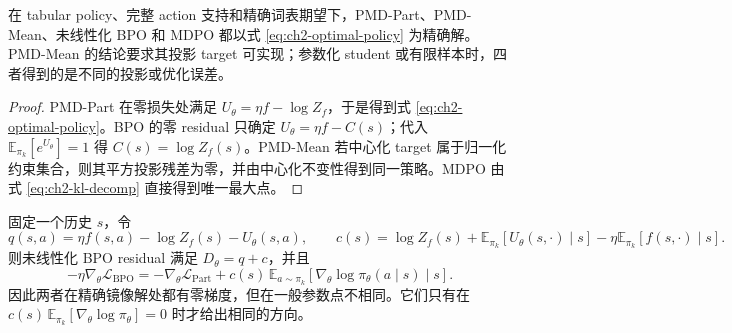 \begin{theorem}
\label{thm:ch2-inner-common-root}
在 tabular policy、完整 action 支持和精确词表期望下，PMD-Part、PMD-Mean、未线性化 BPO 和 MDPO 都以式 \eqref{eq:ch2-optimal-policy} 为精确解。PMD-Mean 的结论要求其投影 target 可实现；参数化 student 或有限样本时，四者得到的是不同的投影或优化误差。
\end{theorem}

\begin{proof}
PMD-Part 在零损失处满足 $U_\theta=\eta f-\log Z_f$，于是得到式 \eqref{eq:ch2-optimal-policy}。BPO 的零 residual 只确定 $U_\theta=\eta f-C(s)$；代入 $\mathbb E_{\pi_k}[e^{U_\theta}]=1$ 得 $C(s)=\log Z_f(s)$。PMD-Mean 若中心化 target 属于归一化约束集合，则其平方投影残差为零，并由中心化不变性得到同一策略。MDPO 由式 \eqref{eq:ch2-kl-decomp} 直接得到唯一最大点。
\end{proof}


\begin{proposition}
\label{prop:ch2-bpo-part-gradient-gap}
固定一个历史 $s$，令
\begin{equation}
\label{eq:ch2-bpo-part-qc}
q(s,a)=\eta f(s,a)-\log Z_f(s)-U_\theta(s,a),
\qquad
c(s)=\log Z_f(s)+\mathbb E_{\pi_k}[U_\theta(s,\cdot)\mid s]-\eta\mathbb E_{\pi_k}[f(s,\cdot)\mid s].
\end{equation}
则未线性化 BPO residual 满足 $D_\theta=q+c$，并且
\begin{equation}
\label{eq:ch2-bpo-part-gradient-gap}
-\eta\nabla_\theta\mathcal L_{\mathrm{BPO}}
=-\nabla_\theta\mathcal L_{\mathrm{Part}}
+c(s)\,\mathbb E_{a\sim\pi_k}[\nabla_\theta\log\pi_\theta(a\mid s)\mid s].
\end{equation}
因此两者在精确镜像解处都有零梯度，但在一般参数点不相同。它们只有在
$c(s)\,\mathbb E_{\pi_k}[\nabla_\theta\log\pi_\theta]=0$
时才给出相同的方向。
\end{proposition}

